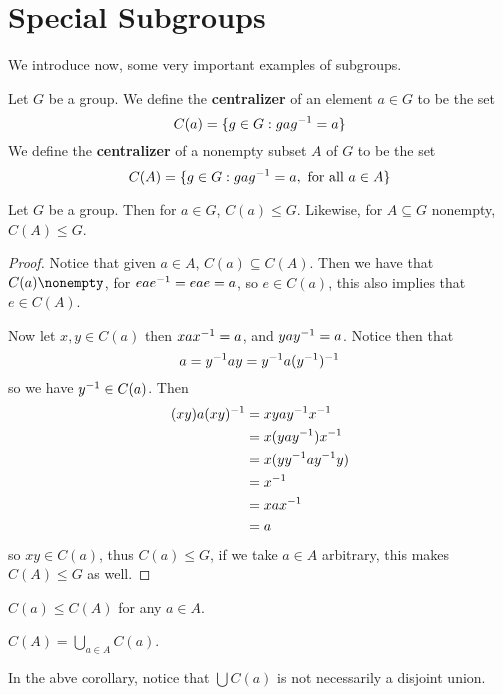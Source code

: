 \section{Special Subgroups}
\label{section_2.2}

We introduce now, some very important examples of subgroups.

\begin{definition}
  Let $G$ be a group. We define the \textbf{centralizer} of an element $a \in
  G$ to be the set
  \begin{equation*}
    C(a)=\{g \in G: gag^{-1}=a\}
  \end{equation*}
  We define the
  \textbf{centralizer} of a nonempty subset $A$ of  $G$ to be the set
  \begin{equation*}
    C(A)=\{g \in G : gag^{-1}=a, \text{ for all } a \in A\}
  \end{equation*}
\end{definition}

\begin{proposition}\label{proposition_2.2.1}
  Let $G$ be a group. Then for  $a \in G$,  $C(a) \leq G$. Likewise, for $A
  \subseteq G$ nonempty, $C(A) \leq G$.
\end{proposition}
\begin{proof}
  Notice that given $a \in A$,  $C(a) \subseteq C(A)$. Then we have that $C(a)
  \nonempty$, for $eae^{-1}=eae=a$, so $e \in C(a)$, this also implies that
  $e \in C(A)$.

  Now let $x,y \in C(a)$ then $xax^{-1}=a$, and $yay^{-1}=a$. Notice then
  that
  \begin{equation*}
    a=y^{-1}ay=y^{-1}a(y^{-1})^{-1}
  \end{equation*}
  so we have $y^{-1} \in C(a)$.
  Then
  \begin{align*}
    (xy)a(xy)^{-1} &=  xyay^{-1}x^{-1} \\
                    &=  x(yay^{-1})x^{-1} \\
                    &=  x(yy^{-1}ay^{-1}y)  \\
                    &=  x^{-1} \\
                    &=  xax^{-1} \\
                    &=  a
  \end{align*}
  so $xy \in C(a)$, thus $C(a) \leq G$, if we take $a
  \in A$ arbitrary, this makes  $C(A) \leq G$ as well.
\end{proof}
\begin{corollary}
  $C(a) \leq C(A)$ for any $a \in A$.
\end{corollary}
\begin{corollary}
  $C(A)=\bigcup_{a \in A}{C(a)}$.
\end{corollary}
\begin{remark}
  In the abve corollary, notice that $\bigcup{C(a)}$ is not necessarily a
  disjoint union.
\end{remark}

